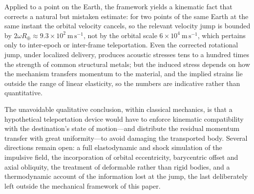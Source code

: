 \documentclass[11pt]{article}
\begin{document}
	Applied to a point on the Earth, the framework yields a kinematic fact
	that corrects a natural but mistaken estimate: for two points of the
	same Earth at the same instant the orbital velocity cancels, so the
	relevant velocity jump is bounded by
	$2\omega R_{\oplus}\approx 9.3\times10^{2}\ \mathrm{m\,s^{-1}}$, not by
	the orbital scale $6\times10^{4}\ \mathrm{m\,s^{-1}}$, which pertains
	only to inter-epoch or inter-frame teleportation. Even the corrected
	rotational jump, under localized delivery, produces acoustic stresses
	tens to a hundred times the strength of common structural metals; but
	the induced stress depends on how the mechanism transfers momentum to
	the material, and the implied strains lie outside the range of linear
	elasticity, so the numbers are indicative rather than quantitative.
	
	The unavoidable qualitative conclusion, within classical mechanics, is
	that a hypothetical teleportation device would have to enforce kinematic
	compatibility with the destination's state of motion---and distribute
	the residual momentum transfer with great uniformity---to avoid damaging
	the transported body. Several directions remain open: a full
	elastodynamic and shock simulation of the impulsive field, the
	incorporation of orbital eccentricity, barycentric offset and axial
	obliquity, the treatment of deformable rather than rigid bodies, and a
	thermodynamic account of the information lost at the jump, the last
	deliberately left outside the mechanical framework of this paper.
	
\end{document}
